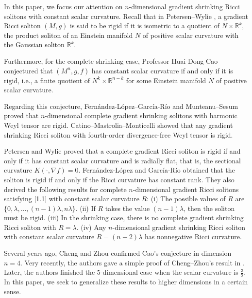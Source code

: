 \documentclass[a4, 12pt]{amsart}
\theoremstyle{plain}
\begin{document}
In this paper, we focus our attention on $n$-dimensional gradient shrinking Ricci solitons with constant scalar curvature. Recall that in Petersen--Wylie \cite{Petersen-Wylie}, a gradient Ricci soliton $(M, g)$ is said to be rigid if it is isometric to a quotient of ${N} \times \mathbb{R}^k$, the product soliton of an Einstein manifold ${N}$ of positive scalar curvature with the Gaussian soliton $\mathbb{R}^k$.

Furthermore, for the complete shrinking case, Professor Huai-Dong Cao conjectured that $(M^n, g, f)$ has constant scalar curvature if and only if it is rigid, i.e., a finite quotient of ${N}^k \times \mathbb{R}^{n-k}$ for some Einstein manifold ${N}$ of positive scalar curvature.

Regarding this conjecture, Fern\'{a}ndez-L\'{o}pez--Garc\'{i}a-R\'{i}o \cite{FR10} and Munteanu--Sesum \cite{Munteanu-Sesum} proved that $n$-dimensional complete gradient shrinking solitons with harmonic Weyl tensor are rigid. Catino--Mastrolia--Monticelli \cite{CMM17} showed that any gradient shrinking Ricci soliton with fourth-order divergence-free Weyl tensor is rigid.

Petersen and Wylie \cite{Petersen-Wylie} proved that a complete gradient Ricci soliton is rigid if and only if it has constant scalar curvature and is radially flat, that is, the sectional curvature $K(\cdot, \nabla f) = 0$. Fern\'{a}ndez-L\'{o}pez and Garc\'{i}a-R\'{i}o \cite{FR16} obtained that the soliton is rigid if and only if the Ricci curvature has constant rank. They also derived the following results for complete $n$-dimensional gradient Ricci solitons satisfying \eqref{1.1} with constant scalar curvature $R$:
(i) The possible values of $R$ are $\{0, \lambda, \dots, (n-1)\lambda, n\lambda\}$.
(ii) If $R$ takes the value $(n-1)\lambda$, then the soliton must be rigid.
(iii) In the shrinking case, there is no complete gradient shrinking Ricci soliton with $R = \lambda$.
(iv) Any $n$-dimensional gradient shrinking Ricci soliton with constant scalar curvature $R = (n-2)\lambda$ has nonnegative Ricci curvature.

Several years ago, Cheng and Zhou \cite{Cheng-Zhou} confirmed Cao's conjecture in dimension $n = 4$. Very recently, the authors gave a simple proof of Cheng--Zhou's result in \cite{Ou-Qu-Wu}. Later, the authors \cite{Li-Ou-Qu-Wu} finished the $5$-dimensional case when the scalar curvature is $\frac{3}{2}$. In this paper, we seek to generalize these results to higher dimensions in a certain sense.
\end{document}
